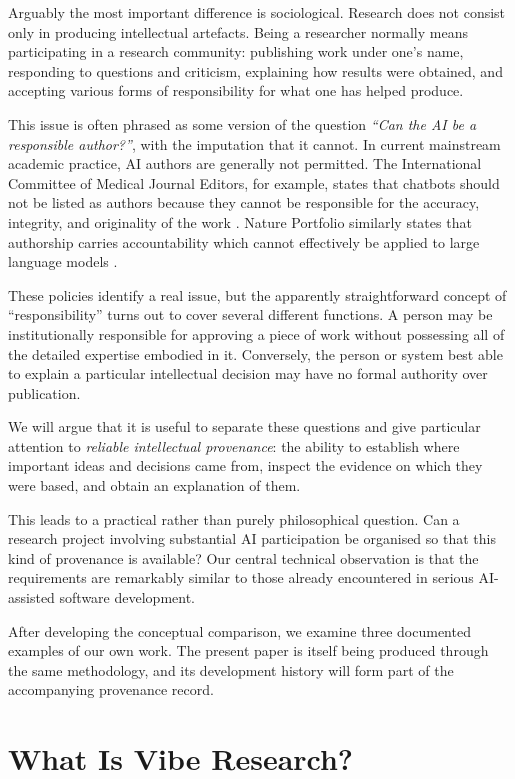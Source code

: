 Arguably the most important difference is sociological. Research does not consist only in producing intellectual artefacts. Being a researcher normally means participating in a research community: publishing work under one's name, responding to questions and criticism, explaining how results were obtained, and accepting various forms of responsibility for what one has helped produce.

This issue is often phrased as some version of the question \emph{``Can the AI be a responsible author?''}, with the imputation that it cannot. In current mainstream academic practice, AI authors are generally not permitted. The International Committee of Medical Journal Editors, for example, states that chatbots should not be listed as authors because they cannot be responsible for the accuracy, integrity, and originality of the work \citep{icmje2026ai}. Nature Portfolio similarly states that authorship carries accountability which cannot effectively be applied to large language models \citep{nature2026ai}.

These policies identify a real issue, but the apparently straightforward concept of ``responsibility'' turns out to cover several different functions. A person may be institutionally responsible for approving a piece of work without possessing all of the detailed expertise embodied in it. Conversely, the person or system best able to explain a particular intellectual decision may have no formal authority over publication.

We will argue that it is useful to separate these questions and give particular attention to \emph{reliable intellectual provenance}: the ability to establish where important ideas and decisions came from, inspect the evidence on which they were based, and obtain an explanation of them.

This leads to a practical rather than purely philosophical question. Can a research project involving substantial AI participation be organised so that this kind of provenance is available? Our central technical observation is that the requirements are remarkably similar to those already encountered in serious AI-assisted software development.

After developing the conceptual comparison, we examine three documented examples of our own work. The present paper is itself being produced through the same methodology, and its development history will form part of the accompanying provenance record.


\section{What Is Vibe Research?}

